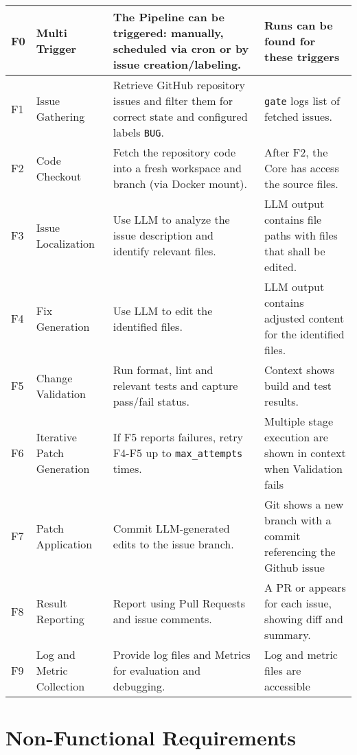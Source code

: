 \begin{longtable}{@{\extracolsep{\fill}} p{0.5cm} | p{3cm} | p{6cm} | p{4cm} @{}}
    \hline
    \endfoot
        F0 \label{f0} & Multi Trigger
        & The Pipeline can be triggered: manually, scheduled via cron or by issue creation/labeling.
        & Runs can be found for these triggers \\ \hline
        F1 \label{f1} & Issue Gathering
        & Retrieve GitHub repository issues and filter them for correct state and configured labels \texttt{BUG}.
        & \texttt{gate} logs list of fetched issues.  \\ \hline
        F2 \label{f2} & Code Checkout
        & Fetch the repository code into a fresh workspace and branch (via Docker mount).
        & After F2, the Core has access the source files. \\ \hline
        F3 \label{f3} & Issue Localization
        & Use LLM to analyze the issue description and identify relevant files.
        & LLM output contains file paths with files that shall be edited. \\ \hline
        F4 \label{f4} & Fix Generation
        & Use LLM to edit the identified files.
        & LLM output contains adjusted content for the identified files. \\ \hline
        F5 \label{f5} & Change Validation
        & Run format, lint and relevant tests and capture pass/fail status.
        & Context shows build and test results. \\ \hline
        F6 \label{f6} & Iterative Patch Generation
        & If F5 reports failures, retry F4-F5 up to \texttt{max\_attempts} times.
        & Multiple stage execution are shown in context when Validation fails \\ \hline
        F7 \label{f7} & Patch Application
        & Commit LLM-generated edits to the issue branch.
        & Git shows a new branch with a commit referencing the Github issue \\ \hline
        F8 \label{f8} & Result Reporting
        & Report using Pull Requests and issue comments.
        & A PR or appears for each issue, showing diff and summary. \\ \hline
        F9 \label{f9} & Log and Metric Collection
        & Provide log files and Metrics for evaluation and debugging.
        & Log and metric files are accessible \\
\end{longtable}

\section{Non-Functional Requirements}

